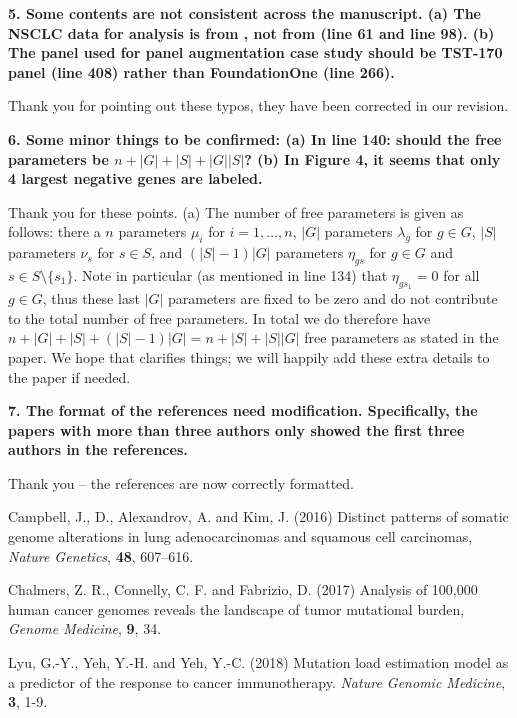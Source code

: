 \documentclass[12pt]{article}
\begin{document}
\textbf{5. Some contents are not consistent across the manuscript.
(a) The NSCLC data for analysis is from \citet{campbell_distinct_2016}, not from \citet{chalmers_analysis_2017} (line 61 and line 98).
(b) The panel used for panel augmentation case study should be TST-170 panel (line 408) rather than FoundationOne (line 266).}

Thank you for pointing out these typos, they have been corrected in our revision. 

\textbf{6. Some minor things to be confirmed:
(a) In line 140: should the free parameters be $n + |G| + |S| + |G||S|$?
(b) In Figure 4, it seems that only 4 largest negative genes are labeled.}

Thank you for these points. (a) The number of free parameters is given as follows: there a $n$ parameters $\mu_i$ for $i = 1, \ldots, n$, $|G|$ parameters $\lambda_g$ for $g \in G$, $|S|$ parameters $\nu_s$ for $s \in S$, and $(|S| - 1) |G|$ parameters $\eta_{gs}$ for $g \in G$ and $s \in S \setminus \{s_1\}$. Note in particular (as mentioned in line 134) that $\eta_{gs_1} = 0$ for all $g \in G$, thus these last $|G|$ parameters are fixed to be zero and do not contribute to the total number of free parameters. In total we do therefore have $n + |G| + |S| + (|S|-1)|G| = n + |S| + |S||G|$ free parameters as stated in the paper.  We hope that clarifies things; we will happily add these extra details to the paper if needed.   

\textbf{7. The format of the references need modification. Specifically, the papers with more than three authors only showed the first three authors in the references.}

Thank you -- the references are now correctly formatted.   


\begin{thebibliography}{75}
 Campbell, J., D., Alexandrov, A. and Kim, J. (2016) Distinct patterns of somatic genome alterations in lung adenocarcinomas and squamous cell carcinomas, \emph{Nature Genetics}, \textbf{48}, 607--616.

 Chalmers, Z. R., Connelly, C. F. and Fabrizio, D. (2017) Analysis of 100,000 human cancer genomes reveals the landscape of tumor mutational burden, \emph{Genome Medicine}, \textbf{9}, 34.

 Lyu, G.-Y., Yeh, Y.-H. and Yeh, Y.-C. (2018) Mutation load estimation model as a predictor of the response to cancer immunotherapy. \emph{Nature Genomic Medicine}, \textbf{3}, 1-9.
\end{thebibliography}
\end{document}
